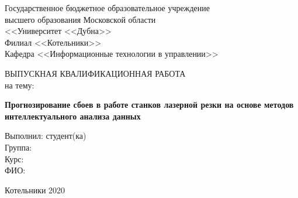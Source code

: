 \begin{titlepage}
\newpage

\begin{center}
Государственное бюджетное образовательное учреждение \\
высшего образования Московской области \\
<<Университет <<Дубна>> \\
Филиал <<Котельники>> \\
\vspace{1cm}
Кафедра <<Информационные технологии в управлении>>
\end{center}

\vspace{2em}

\begin{center}
ВЫПУСКНАЯ КВАЛИФИКАЦИОННАЯ РАБОТА \\ на тему:
\end{center}

\begin{center}
\textbf{Прогнозирование сбоев в работе станков лазерной резки на основе методов интеллектуального анализа данных}
\end{center}

\vspace{6em}

\begin{flushleft}
\hfill \hfill Выполнил: студент(ка) \\
\hfill \hfill Группа: \hrulefill \\
\hfill \hfill Курс: \hrulefill \\
\hfill \hfill ФИО: \hrulefill \\

\end{flushleft}

\vspace{\fill}

\begin{center}
Котельники 2020
\end{center}

\end{titlepage}